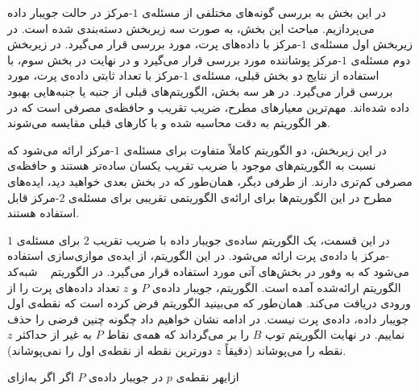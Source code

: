 
در این بخش به بررسی گونه‌های مختلفی از مسئله‌ی $1$-مرکز در حالت جویبار داده می‌پردازیم.
مباحث این بخش، به صورت سه زیربخش دسته‌بندی شده است.
در زیربخش اول مسئله‌ی $1$-مرکز با داده‌های پرت، مورد بررسی قرار می‌گیرد.
در زیربخش دوم مسئله‌ی $1$-مرکز پوشاننده مورد بررسی قرار می‌گیرد و در نهایت در بخش سوم، با استفاده از نتایج دو بخش قبلی، مسئله‌ی $1$-مرکز با تعداد ثابتی داده‌ی پرت، مورد بررسی قرار می‌گیرد.
در هر سه بخش، الگوریتم‌های قبلی از جنبه یا جنبه‌هایی بهبود داده شده‌اند.
مهم‌ترین معیارهای مطرح، ضریب تقریب و حافظه‌ی مصرفی است که در هر الگوریتم به دقت محاسبه شده و با کارهای قبلی مقایسه می‌شوند.


در این زیربخش، دو الگوریتم کاملاً متفاوت برای مسئله‌ی $1$-مرکز ارائه می‌شود که نسبت به الگوریتم‌های موجود با ضریب تقریب یکسان ساده‌تر هستند و حافظه‌ی مصرفی کم‌تری دارند.
از طرفی دیگر، همان‌طور که در بخش بعدی خواهید دید، ایده‌های مطرح در این الگوریتم‌ها برای ارائه‌ی الگوریتمی تقریبی برای مسئله‌ی $2$-مرکز قابل استفاده هستند.


در این قسمت، یک الگوریتم ساده‌ی جویبار داده با ضریب تقریب $2$ برای مسئله‌ی $1$-مرکز با داده‌ی پرت ارائه می‌شود.
در این الگوریتم، از ایده‌ی موازی‌سازی استفاده می‌شود که به وفور در بخش‌های آتی مورد استفاده قرار می‌گیرد.
در الگوریتم ~ شبه‌کد الگوریتم ارائه‌شده آمده است.
الگوریتم، جویبار داده‌ی $P$ و $z$ تعداد داده‌های پرت را از ورودی دریافت می‌کند.
همان‌طور که می‌بینید الگوریتم فرض کرده است که نقطه‌ی اول جویبار داده، داده‌ی پرت نیست.
در ادامه نشان خواهیم داد چگونه چنین فرضی را حذف نماییم.
در نهایت الگوریتم توپ $B$ را بر می‌گرداند که همه‌ی نقاط $P$ به غیر از حداکثر $z$ نقطه را می‌پوشاند (دقیقاً $z$ دورترین نقطه از نقطه‌ی اول را نمی‌پوشاند).

‌ازای{هر نقطه‌ی $p$ در جویبار داده‌ی $P$}
‌اگر
‌اگر
‌به‌ازای{}

